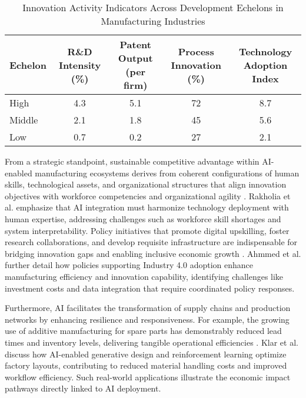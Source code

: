 \documentclass[sigconf]{acmart}
\begin{document}
\begin{table*}[htbp]
\centering
\caption{Innovation Activity Indicators Across Development Echelons in Manufacturing Industries \cite{ref21}}
\label{tab:innovation_echelons}
\begin{adjustbox}{max width=\textwidth}
\begin{tabular}{@{}lcccc@{}}
\toprule
Echelon & R\&D Intensity (\%) & Patent Output (per firm) & Process Innovation (\%) & Technology Adoption Index \\ \midrule
High & 4.3 & 5.1 & 72 & 8.7 \\
Middle & 2.1 & 1.8 & 45 & 5.6 \\
Low & 0.7 & 0.2 & 27 & 2.1 \\
\bottomrule
\end{tabular}
\end{adjustbox}
\end{table*}

From a strategic standpoint, sustainable competitive advantage within AI-enabled manufacturing ecosystems derives from coherent configurations of human skills, technological assets, and organizational structures that align innovation objectives with workforce competencies and organizational agility \cite{ref36}. Rakholia et al. \cite{ref36} emphasize that AI integration must harmonize technology deployment with human expertise, addressing challenges such as workforce skill shortages and system interpretability. Policy initiatives that promote digital upskilling, foster research collaborations, and develop requisite infrastructure are indispensable for bridging innovation gaps and enabling inclusive economic growth \cite{ref38}. Ahmmed et al. \cite{ref38} further detail how policies supporting Industry 4.0 adoption enhance manufacturing efficiency and innovation capability, identifying challenges like investment costs and data integration that require coordinated policy responses.

Furthermore, AI facilitates the transformation of supply chains and production networks by enhancing resilience and responsiveness. For example, the growing use of additive manufacturing for spare parts has demonstrably reduced lead times and inventory levels, delivering tangible operational efficiencies \cite{ref9}. Klar et al. \cite{ref9} discuss how AI-enabled generative design and reinforcement learning optimize factory layouts, contributing to reduced material handling costs and improved workflow efficiency. Such real-world applications illustrate the economic impact pathways directly linked to AI deployment.
\end{document}
